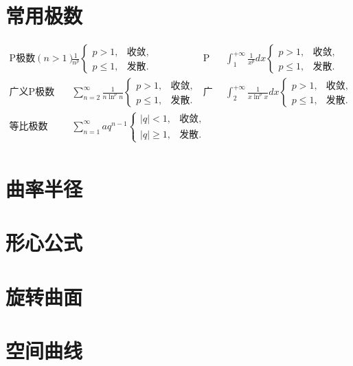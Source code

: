 ﻿\documentclass[a4paper,12pt,UTF8]{ctexart}
\begin{document}
    \section{常用极数}
    \begin{align*}
        \text{P极数}(n>1)\enspace& \frac{1}{n^{p}}
        \begin{cases}
            p>1,&\text{收敛},\\
            p \leq 1,&\text{发散}.
        \end{cases}&
        \text{P积分}\enspace& \int_{1}^{+\infty}\frac{1}{x^{p}}dx
        \begin{cases}
            p>1,&\text{收敛},\\
            p \leq 1,&\text{发散}.
        \end{cases}&\\
        \text{广义P极数}\enspace& \sum_{n=2}^{\infty}\frac{1}{n \ln^p n}
        \begin{cases}
            p>1,&\text{收敛},\\
            p \leq 1,&\text{发散}.
        \end{cases}&
        \text{广义P积分}\enspace& \int_{2}^{+\infty}\frac{1}{x \ln^p x}dx
        \begin{cases}
            p>1,&\text{收敛},\\
            p \leq 1,&\text{发散}.
        \end{cases}&\\
        \text{等比极数}\enspace& \sum_{n=1}^{\infty}aq^{n-1}
        \begin{cases}
            |q|<1,&\text{收敛},\\
            |q| \geq 1,&\text{发散}.
        \end{cases}&\\
    \end{align*}

    \section{曲率半径}

    \section{形心公式}

    \section{旋转曲面}

    \section{空间曲线}
\end{document}
